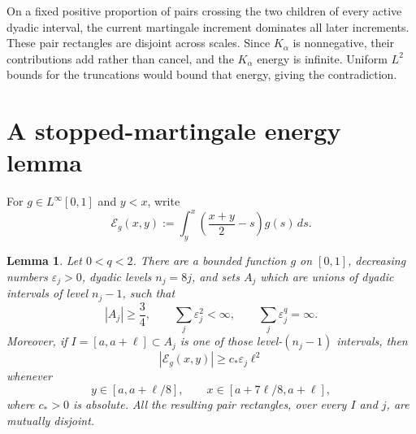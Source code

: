 \documentclass[11pt]{article}
\newtheorem{lemma}[theorem]{Lemma}
\newcommand{\Ecal}{\mathcal E}
\begin{document}
On a fixed positive proportion of pairs crossing the two children of every
active dyadic interval, the current martingale increment dominates all later
increments.  These pair rectangles are disjoint across scales.  Since
$K_\alpha$ is nonnegative, their contributions add rather than cancel, and
the $K_\alpha$ energy is infinite.  Uniform $L^2$ bounds for the truncations
would bound that energy, giving the contradiction.

\section{A stopped-martingale energy lemma}

For $g\in L^\infty[0,1]$ and $y<x$, write
\[
 \Ecal_g(x,y):=\int_y^x\left(\frac{x+y}{2}-s\right)g(s)\,ds.
\]

\begin{lemma}\label{lem:mart}
Let $0<q<2$.  There are a bounded function $g$ on $[0,1]$, decreasing
numbers $\varepsilon_j>0$, dyadic levels $n_j=8j$, and sets $A_j$ which are
unions of dyadic intervals of level $n_j-1$, such that
\[
 |A_j|\geq\frac34,\qquad
 \sum_j\varepsilon_j^2<\infty,\qquad
 \sum_j\varepsilon_j^q=\infty.
\]
Moreover, if $I=[a,a+\ell]\subset A_j$ is one of those level-$(n_j-1)$
intervals, then
\[
 |\Ecal_g(x,y)|\geq c_*\varepsilon_j\ell^2
 \tag{3.1}
\]
whenever
\[
 y\in[a,a+\ell/8],\qquad
 x\in[a+7\ell/8,a+\ell],
\]
where $c_*>0$ is absolute.  All the resulting pair rectangles, over every
$I$ and $j$, are mutually disjoint.
\end{lemma}
\end{document}
